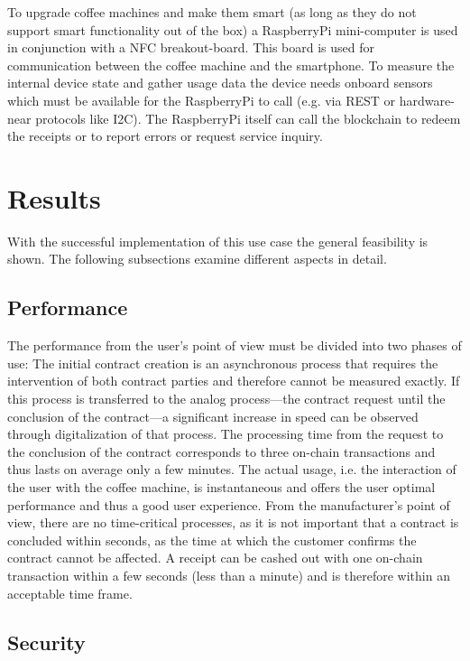 \documentclass[conference]{IEEEtran}
\begin{document}
To upgrade coffee machines and make them smart (as long as they do not support smart functionality out of the box) a RaspberryPi mini-computer is used in conjunction with a NFC breakout-board. This board is used for communication between the coffee machine and the smartphone. To measure the internal device state and gather usage data the device needs onboard sensors which must be available for the RaspberryPi to call (e.g. via REST or hardware-near protocols like I2C). The RaspberryPi itself can call the blockchain to redeem the receipts or to report errors or request service inquiry.

%
\section{Results}

With the successful implementation of this use case the general feasibility is shown. The following subsections examine different aspects in detail.

%
\subsection{Performance}

The performance from the user's point of view must be divided into two phases of use: The initial contract creation is an asynchronous process that requires the intervention of both contract parties and therefore cannot be measured exactly. If this process is transferred to the analog process---the contract request until the conclusion of the contract---a significant increase in speed can be observed through digitalization of that process. The processing time from the request to the conclusion of the contract corresponds to three on-chain transactions and thus lasts on average only a few minutes. The actual usage, i.e. the interaction of the user with the coffee machine, is instantaneous and offers the user optimal performance and thus a good user experience. From the manufacturer's point of view, there are no time-critical processes, as it is not important that a contract is concluded within seconds, as the time at which the customer confirms the contract cannot be affected. A receipt can be cashed out with one on-chain transaction within a few seconds (less than a minute) and is therefore within an acceptable time frame. 

%
\subsection{Security}
\end{document}
